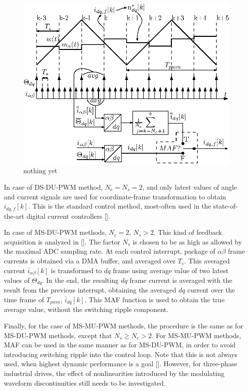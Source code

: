 \documentclass[journal]{IEEEtran}
\begin{document}
\begin{figure}[t!]
    \centerline{\includegraphics[width=0.95\linewidth]{figures/timing_diagram.eps}}
    \caption{nothing yet}
    \label{fig:timings}
\end{figure}

In case of DS-DU-PWM method, $N_c = N_s = 2$, and only latest values of angle and current signals are used for coordinate-frame transformation to obtain $i_{dq,f}[k]$. This is the standard control method, most-often used in the state-of-the-art digital current controllers []. 

In case of MS-DU-PWM methods, $N_c = 2$, $N_s>2$. This kind of feedback acquisition is analyzed in []. The factor $N_s$ is chosen to be as high as allowed by the maximal ADC sampling rate. At each control interrupt, package of $\alpha \beta$ frame currents is obtained via a DMA buffer, and averaged over $T_c$. This averaged current $\overline{i}_{\alpha \beta}[k]$ is transformed to $dq$ frame using average value of two latest values of $\Theta_{dq}$. In the end, the resulting $dq$ frame current is averaged with the result from the previous interrupt, obtaining the averaged $dq$ current over the time frame of $T_{pwm}$, $\overline{i}_{dq}[k]$. This MAF function is used to obtain the true average value, without the switching ripple component. 

Finally, for the case of MS-MU-PWM methods, the procedure is the same as for MS-DU-PWM methods, except that $N_s \geq N_c > 2$. For MS-MU-PWM methods, MAF can be used in the same manner as for MS-DU-PWM, in order to avoid introducing switching ripple into the control loop. Note that this is not always used, when highest dynamic performance is a goal []. However, for three-phase industrial drives, the effect of nonlinearities introduced by the modulating waveform discontinuities still needs to be investigated. 
\end{document}
